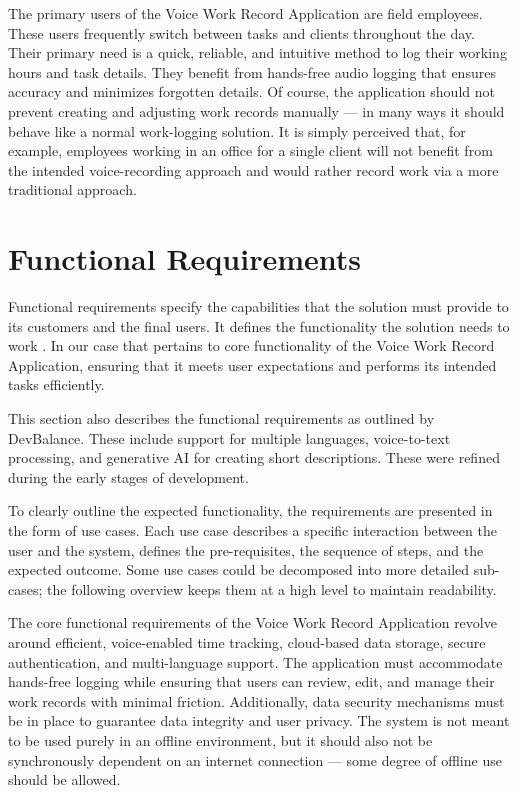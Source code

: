 \documentclass[
  digital,     %
  oneside,     %
  nosansbold,  %
  nocolorbold, %
  lof,         %
  lot,         %
]{fithesis4}
\begin{document}

The primary users of the Voice Work Record Application are field employees. These users frequently switch between tasks and clients throughout the day. Their primary need is a quick, reliable, and intuitive method to log their working hours and task details. They benefit from hands-free audio logging that ensures accuracy and minimizes forgotten details. Of course, the application should not prevent creating and adjusting work records manually --- in many ways it should behave like a normal work-logging solution. It is simply perceived that, for example, employees working in an office for a single client will not benefit from the intended voice-recording approach and would rather record work via a more traditional approach.

\section{Functional Requirements}

Functional requirements specify the capabilities that the solution must provide to its customers and the final users. It defines the functionality the solution needs to work \cite{delfinobook2015}. In our case that pertains to core functionality of the Voice Work Record Application, ensuring that it meets user expectations and performs its intended tasks efficiently.

This section also describes the functional requirements as outlined by DevBalance. These include support for multiple languages, voice-to-text processing, and generative \gls{AI} for creating short descriptions. These were refined during the early stages of development.

To clearly outline the expected functionality, the requirements are presented in the form of use cases. Each use case describes a specific interaction between the user and the system, defines the pre-requisites, the sequence of steps, and the expected outcome. Some use cases could be decomposed into more detailed sub-cases; the following overview keeps them at a high level to maintain readability.

The core functional requirements of the Voice Work Record Application revolve around efficient, voice-enabled time tracking, cloud-based data storage, secure authentication, and multi-language support. The application must accommodate hands-free logging while ensuring that users can review, edit, and manage their work records with minimal friction. Additionally, data security mechanisms must be in place to guarantee data integrity and user privacy. The system is not meant to be used purely in an offline environment, but it should also not be synchronously dependent on an internet connection --- some degree of offline use should be allowed.
\end{document}
